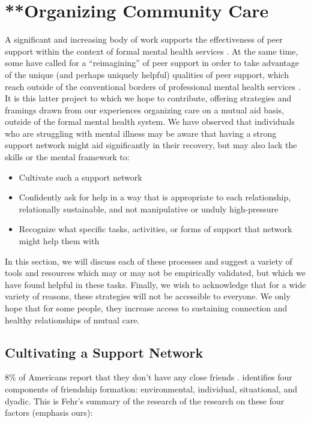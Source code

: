 \documentclass[12pt,letterpaper]{book}
\begin{document}
\section{**Organizing Community Care}
\label{sec:organizingcare}
A significant and increasing body of work supports the effectiveness of peer support within the context of formal mental health services \cite{shalaby2020peer}. At the same time, some have called for a “reimagining” of peer support in order to take advantage of the unique (and perhaps uniquely helpful) qualities of peer support, which reach outside of the conventional borders of professional mental health services \cite{gillard2019peer}. It is this latter project to which we hope to contribute, offering strategies and framings drawn from our experiences organizing care on a mutual aid basis, outside of the formal mental health system. We have observed that individuals who are struggling with mental illness may be aware that having a strong support network might aid significantly in their recovery, but may also lack the skills or the mental framework to:
\begin{itemize}
	\item Cultivate such a support network
	\item Confidently ask for help in a way that is appropriate to each relationship, relationally sustainable, and not manipulative or unduly high-pressure
	\item Recognize what specific tasks, activities, or forms of support that network might help them with
\end{itemize}

In this section, we will discuss each of these processes and suggest a variety of tools and resources which may or may not be empirically validated, but which we have found helpful in these tasks. Finally, we wish to acknowledge that for a wide variety of reasons, these strategies will not be accessible to everyone. We only hope that for some people, they increase access to sustaining connection and healthy relationships of mutual care.

\subsection*{Cultivating a Support Network}

8\% of Americans report that they don't have any close friends \cite{pewFriends}. \textcite{fehr2008friendship} identifies four components of friendship formation: environmental, individual, situational, and dyadic. This is Fehr's summary of the research of the research on these four factors (emphasis ours):
\end{document}
